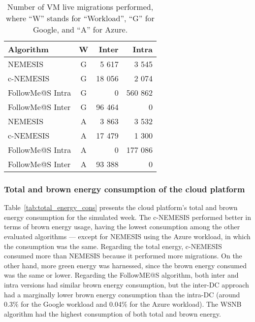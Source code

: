 \begin{table}[!ht]
\caption{Number of VM live migrations performed, where ``W'' stands for ``Workload'', ``G'' for Google, and ``A'' for Azure. }\label{tab:amount_migs} \centering
\begin{tabular}{|l|c|r|r|}
  \hline
  \textbf{Algorithm} & \textbf{W}  & \textbf{Inter} & \textbf{Intra}   \\
  \hline
  NEMESIS  & G & 5 617  & 3 545 \\
  \hline
  c-NEMESIS & G & 18 056  & 2 074 \\
  \hline
  FollowMe@S Intra  & G & 0  & 560 862 \\
  \hline
  FollowMe@S Inter  & G & 96 464 & 0 \\
  \hline
  NEMESIS & A & 3 863 & 3 532 \\
  \hline
  c-NEMESIS & A & 17 479  & 1 300 \\
  \hline
  FollowMe@S Intra  & A & 0  & 177 086 \\
  \hline
  FollowMe@S Inter   & A & 93 388 & 0 \\
  \hline
\end{tabular}
\end{table}

\subsubsection{Total and brown energy consumption of the cloud platform}

Table~\ref{tab:total_energy_cons} presents the cloud platform's total and brown energy consumption for the simulated week. The c-NEMESIS performed better in terms of brown energy usage, having the lowest consumption among the other evaluated algorithms --- except for NEMESIS using the Azure workload, in which the consumption was the same. Regarding the total energy, c-NEMESIS consumed more than NEMESIS because it performed more migrations. On the other hand, more green energy was harnessed, since the brown energy consumed was the same or lower. Regarding the FollowME@S algorithm, both inter and intra versions had similar brown energy consumption, but the inter-DC approach had a marginally lower brown energy consumption than the intra-DC (around 0.3\% for the Google workload and 0.04\% for the Azure workload). The WSNB algorithm had the highest consumption of both total and brown energy.

